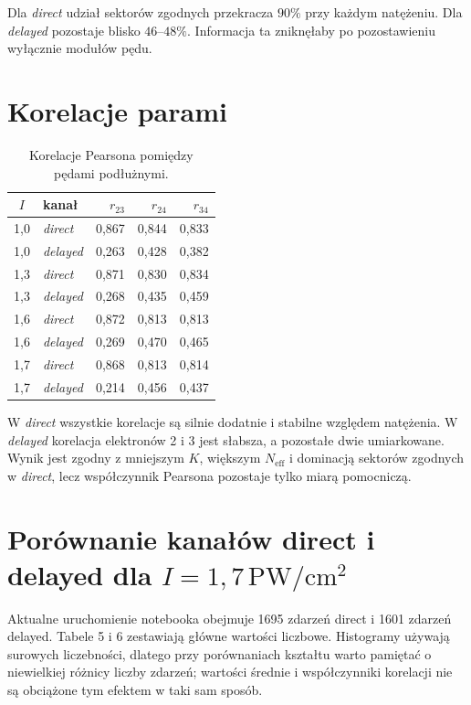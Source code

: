 \documentclass[12pt,letterpaper,oneside]{report}
\numberwithin{equation}{chapter}
\numberwithin{figure}{chapter}
\numberwithin{table}{chapter}
\newcommand{\direct}{\textit{direct}}
\newcommand{\delayed}{\textit{delayed}}
\begin{document}
Dla \direct{} udział sektorów zgodnych przekracza $90\%$ przy każdym natężeniu. Dla \delayed{} pozostaje blisko $46$--$48\%$. Informacja ta zniknęłaby po pozostawieniu wyłącznie modułów pędu.

\section{Korelacje parami}

\begin{table}[htbp]
\centering
\caption{Korelacje Pearsona pomiędzy pędami podłużnymi.}
\label{tab:corr-all}
\small
\begin{tabular}{clrrr}
\toprule
$I$ & kanał & $r_{23}$ & $r_{24}$ & $r_{34}$\\
\midrule
1,0 & \direct  & 0,867 & 0,844 & 0,833\\
1,0 & \delayed & 0,263 & 0,428 & 0,382\\
1,3 & \direct  & 0,871 & 0,830 & 0,834\\
1,3 & \delayed & 0,268 & 0,435 & 0,459\\
1,6 & \direct  & 0,872 & 0,813 & 0,813\\
1,6 & \delayed & 0,269 & 0,470 & 0,465\\
1,7 & \direct  & 0,868 & 0,813 & 0,814\\
1,7 & \delayed & 0,214 & 0,456 & 0,437\\
\bottomrule
\end{tabular}
\end{table}

W \direct{} wszystkie korelacje są silnie dodatnie i stabilne względem natężenia. W \delayed{} korelacja elektronów 2 i 3 jest słabsza, a pozostałe dwie umiarkowane. Wynik jest zgodny z mniejszym $K$, większym $N_{\mathrm{eff}}$ i dominacją sektorów zgodnych w \direct{}, lecz współczynnik Pearsona pozostaje tylko miarą pomocniczą.


\section{Porównanie kanałów direct i delayed dla $I=1{,}7\,\mathrm{PW/cm^2}$}

Aktualne uruchomienie notebooka obejmuje 1695 zdarzeń direct i 1601
zdarzeń delayed. Tabele 5 i 6 zestawiają główne wartości liczbowe.
Histogramy używają surowych liczebności, dlatego przy porównaniach
kształtu warto pamiętać o niewielkiej różnicy liczby zdarzeń; wartości
średnie i współczynniki korelacji nie są obciążone tym efektem w taki
sam sposób.
\end{document}
